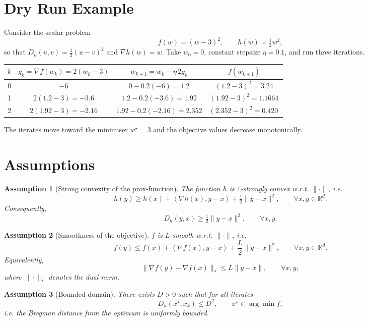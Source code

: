 \documentclass{article}
\newtheorem{assumption}{Assumption}
\newcommand{\breg}[2]{D_{h}\!\left(#1,#2\right)}
\newcommand{\inner}[2]{\left\langle #1,#2\right\rangle}
\newcommand{\gradf}{\nabla f}
\newcommand{\gradh}{\nabla h}
\begin{document}
\section*{Dry Run Example}
Consider the scalar problem
\[
f(w)=(w-3)^2,\qquad h(w)=\tfrac12 w^{2},
\]
so that $D_h(u,v)=\tfrac12 (u-v)^2$ and $\gradh(w)=w$.
Take $w_0=0$, constant stepsize $\eta=0.1$, and run three iterations.

\begin{center}
\begin{tabular}{c|c|c|c}
$k$ & $g_k=\gradf(w_k)=2(w_k-3)$ & $w_{k+1}=w_k-\eta\,2g_k$ & $f(w_{k+1})$\\\hline
0 & $-6$ & $0-0.2(-6)=1.2$ & $(1.2-3)^2=3.24$\\
1 & $2(1.2-3)=-3.6$ & $1.2-0.2(-3.6)=1.92$ & $(1.92-3)^2=1.1664$\\
2 & $2(1.92-3)=-2.16$ & $1.92-0.2(-2.16)=2.352$ & $(2.352-3)^2=0.420\,$\\
\end{tabular}
\end{center}
The iterates move toward the minimiser $w^{\star}=3$ and the objective values decrease monotonically.

\newpage
\section*{Assumptions}
\begin{assumption}[Strong convexity of the prox‑function]
The function $h$ is $1$‑strongly convex w.r.t. $\|\cdot\|$, i.e.
\[
h(y)\ge h(x)+\inner{\gradh(x)}{y-x}+\tfrac12\|y-x\|^{2},
\qquad\forall x,y\in\mathbb{R}^{d}.
\tag{A1}
\]
Consequently,
\[
\breg{y}{x}\ge \tfrac12\|y-x\|^{2},\qquad\forall x,y.
\tag{A1$'$}
\]
\end{assumption}

\begin{assumption}[Smoothness of the objective]
$f$ is $L$‑smooth w.r.t. $\|\cdot\|$, i.e.
\[
f(y)\le f(x)+\inner{\gradf(x)}{y-x}
+\frac{L}{2}\|y-x\|^{2},
\qquad\forall x,y\in\mathbb{R}^{d}.
\tag{A2}
\]
Equivalently,
\[
\|\gradf(y)-\gradf(x)\|_{*}\le L\|y-x\|,
\qquad\forall x,y,
\tag{A2$'$}
\]
where $\|\cdot\|_{*}$ denotes the dual norm.
\end{assumption}

\begin{assumption}[Bounded domain]
There exists $D>0$ such that for all iterates
\[
\breg{x^{\star}}{x_k}\le D^{2},
\qquad x^{\star}\in\arg\min f,
\tag{A3}
\]
i.e. the Bregman distance from the optimum is uniformly bounded.
\end{assumption}
\end{document}
